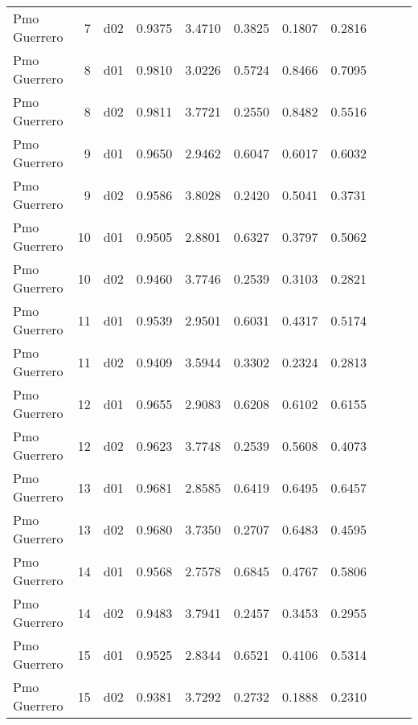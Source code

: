 \begin{landscape}
\begin{longtable}{p{2cm}rrrrrrrrrr}
         Pmo Guerrero  &          7 &     d02 &   0.9375 &  3.4710 &        0.3825 &           0.1807 &  0.2816 \\
         Pmo Guerrero  &          8 &     d01 &   0.9810 &  3.0226 &        0.5724 &           0.8466 &  0.7095 \\
         Pmo Guerrero  &          8 &     d02 &   0.9811 &  3.7721 &        0.2550 &           0.8482 &  0.5516 \\
         Pmo Guerrero  &          9 &     d01 &   0.9650 &  2.9462 &        0.6047 &           0.6017 &  0.6032 \\
         Pmo Guerrero  &          9 &     d02 &   0.9586 &  3.8028 &        0.2420 &           0.5041 &  0.3731 \\
         Pmo Guerrero  &         10 &     d01 &   0.9505 &  2.8801 &        0.6327 &           0.3797 &  0.5062 \\
         Pmo Guerrero  &         10 &     d02 &   0.9460 &  3.7746 &        0.2539 &           0.3103 &  0.2821 \\
         Pmo Guerrero  &         11 &     d01 &   0.9539 &  2.9501 &        0.6031 &           0.4317 &  0.5174 \\
         Pmo Guerrero  &         11 &     d02 &   0.9409 &  3.5944 &        0.3302 &           0.2324 &  0.2813 \\
         Pmo Guerrero  &         12 &     d01 &   0.9655 &  2.9083 &        0.6208 &           0.6102 &  0.6155 \\
         Pmo Guerrero  &         12 &     d02 &   0.9623 &  3.7748 &        0.2539 &           0.5608 &  0.4073 \\
         Pmo Guerrero  &         13 &     d01 &   0.9681 &  2.8585 &        0.6419 &           0.6495 &  0.6457 \\
         Pmo Guerrero  &         13 &     d02 &   0.9680 &  3.7350 &        0.2707 &           0.6483 &  0.4595 \\
         Pmo Guerrero  &         14 &     d01 &   0.9568 &  2.7578 &        0.6845 &           0.4767 &  0.5806 \\
         Pmo Guerrero  &         14 &     d02 &   0.9483 &  3.7941 &        0.2457 &           0.3453 &  0.2955 \\
         Pmo Guerrero  &         15 &     d01 &   0.9525 &  2.8344 &        0.6521 &           0.4106 &  0.5314 \\
         Pmo Guerrero  &         15 &     d02 &   0.9381 &  3.7292 &        0.2732 &           0.1888 &  0.2310 \\

\end{longtable}
\end{landscape}
